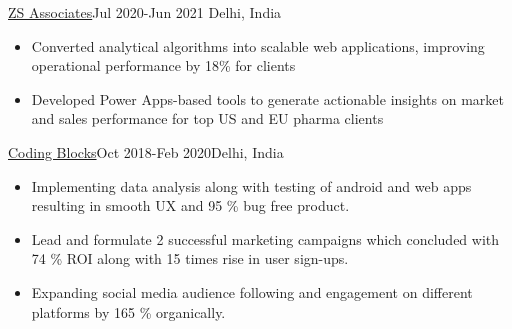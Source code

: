 \documentclass[10pt,a4paper,ragged2e]{altacv}
\begin{document}
 {\color{mecol}\href{https://www.zs.com/}{ZS Associates}}{Jul 2020-Jun 2021 }{Delhi, India}
\begin{itemize}

\item { Converted analytical algorithms into scalable web applications, improving operational performance by 18\% for clients}
\item {Developed Power Apps-based tools to generate actionable insights on market and sales performance for top US and EU pharma clients }




\end{itemize}
\divider


 {\color{mecol}\href{https://codingblocks.com}{Coding Blocks}}{Oct 2018-Feb 2020}{Delhi, India}
\begin{itemize}

\item {Implementing data analysis along with testing of android and web apps resulting in smooth UX and 95 \% bug free product.}
\item { Lead and formulate 2 successful marketing campaigns which concluded with 74 \% ROI along with 15 times rise in user sign-ups.}
\item {Expanding social media audience following and engagement on different platforms by 165 \% organically.}

\end{itemize}
\end{document}
